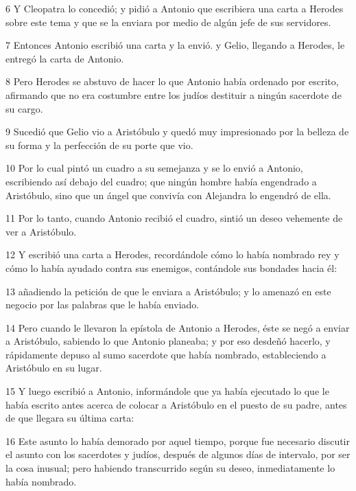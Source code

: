 \par 6 Y Cleopatra lo concedió; y pidió a Antonio que escribiera una carta a Herodes sobre este tema y que se la enviara por medio de algún jefe de sus servidores.

\par 7 Entonces Antonio escribió una carta y la envió. y Gelio, llegando a Herodes, le entregó la carta de Antonio.

\par 8 Pero Herodes se abstuvo de hacer lo que Antonio había ordenado por escrito, afirmando que no era costumbre entre los judíos destituir a ningún sacerdote de su cargo.

\par 9 Sucedió que Gelio vio a Aristóbulo y quedó muy impresionado por la belleza de su forma y la perfección de su porte que vio.

\par 10 Por lo cual pintó un cuadro a su semejanza y se lo envió a Antonio, escribiendo así debajo del cuadro; que ningún hombre había engendrado a Aristóbulo, sino que un ángel que convivía con Alejandra lo engendró de ella.

\par 11 Por lo tanto, cuando Antonio recibió el cuadro, sintió un deseo vehemente de ver a Aristóbulo.

\par 12 Y escribió una carta a Herodes, recordándole cómo lo había nombrado rey y cómo lo había ayudado contra sus enemigos, contándole sus bondades hacia él:

\par 13 añadiendo la petición de que le enviara a Aristóbulo; y lo amenazó en este negocio por las palabras que le había enviado.

\par 14 Pero cuando le llevaron la epístola de Antonio a Herodes, éste se negó a enviar a Aristóbulo, sabiendo lo que Antonio planeaba; y por eso desdeñó hacerlo, y rápidamente depuso al sumo sacerdote que había nombrado, estableciendo a Aristóbulo en su lugar.

\par 15 Y luego escribió a Antonio, informándole que ya había ejecutado lo que le había escrito antes acerca de colocar a Aristóbulo en el puesto de su padre, antes de que llegara su última carta:

\par 16 Este asunto lo había demorado por aquel tiempo, porque fue necesario discutir el asunto con los sacerdotes y judíos, después de algunos días de intervalo, por ser la cosa inusual; pero habiendo transcurrido según su deseo, inmediatamente lo había nombrado.

